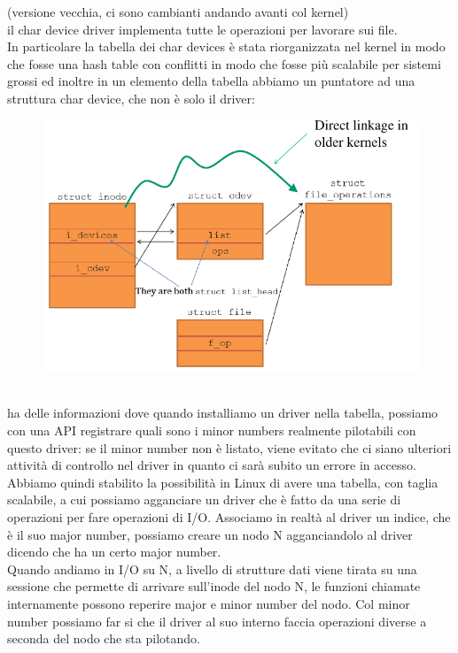 \documentclass[12pt, oneside]{extbook}
\begin{document}
(versione vecchia, ci sono cambianti andando avanti col kernel)\\
il char device driver implementa tutte le operazioni per lavorare sui file.\\In particolare la tabella dei char devices è stata riorganizzata nel kernel in modo che fosse una hash table con conflitti in modo che fosse più scalabile per sistemi grossi ed inoltre in un elemento della tabella abbiamo un puntatore ad una struttura char device, che non è solo il driver:
\begin{figure}[!h]
	\includegraphics[scale=0.5]{immagini/chdev_structure.png}
\end{figure}
\\ha delle informazioni dove quando installiamo un driver nella tabella, possiamo con una API registrare quali sono i minor numbers realmente pilotabili con questo driver: se il minor number non è listato, viene evitato che ci siano ulteriori attività di controllo nel driver in quanto ci sarà subito un errore in accesso.\\Abbiamo quindi stabilito la possibilità in Linux di avere una tabella, con taglia scalabile, a cui possiamo agganciare un driver che è fatto da una serie di operazioni per fare operazioni di I/O. Associamo in realtà al driver un indice, che è il suo major number, possiamo creare un nodo N agganciandolo al driver dicendo che ha un certo major number.\\Quando andiamo in I/O su N, a livello di strutture dati viene tirata su una sessione che permette di arrivare sull'inode del nodo N, le funzioni chiamate internamente possono reperire major e minor number del nodo. Col minor number possiamo far si che il driver al suo interno faccia operazioni diverse a seconda del nodo che sta pilotando.
\end{document}
